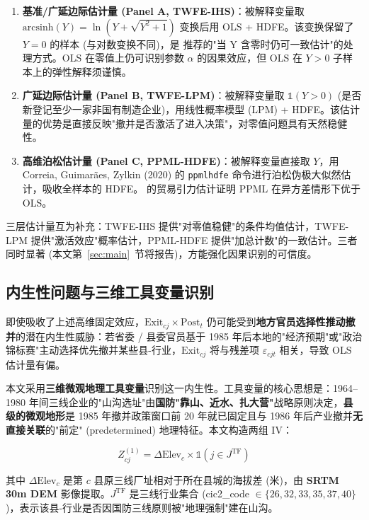\begin{enumerate}
\item \textbf{基准/广延边际估计量 (Panel A, TWFE-IHS)}：被解释变量取 $\mathrm{arcsinh}(Y) = \ln(Y + \sqrt{Y^2 + 1})$ 变换后用 OLS + HDFE。该变换保留了 $Y=0$ 的样本 (与对数变换不同)，是 \citet{chen2024} 推荐的"当 Y 含零时仍可一致估计"的处理方式。OLS 在零值上仍可识别参数 $\alpha$ 的因果效应，但 OLS 在 $Y>0$ 子样本上的弹性解释须谨慎。
\item \textbf{广延边际估计量 (Panel B, TWFE-LPM)}：被解释变量取 $\mathbb{1}(Y>0)$ (是否新登记至少一家非国有制造企业)，用线性概率模型 (LPM) + HDFE。该估计量的优势是直接反映"撤并是否激活了进入决策"，对零值问题具有天然稳健性。
\item \textbf{高维泊松估计量 (Panel C, PPML-HDFE)}：被解释变量直接取 $Y$，用 Correia, Guimarães, Zylkin (2020) 的 \texttt{ppmlhdfe} 命令进行泊松伪极大似然估计，吸收全样本的 HDFE。\citet{silva2006} 的贸易引力估计证明 PPML 在异方差情形下优于 OLS。
\end{enumerate}

三层估计量互为补充：TWFE-IHS 提供"对零值稳健"的条件均值估计，TWFE-LPM 提供"激活效应"概率估计，PPML-HDFE 提供"加总计数"的一致估计。三者同时显著 (本文第~\ref{sec:main}~节将报告)，方能强化因果识别的可信度。

\subsection{内生性问题与三维工具变量识别}\label{sec:strategy:iv}

即使吸收了上述高维固定效应，$\mathrm{Exit}_{cj} \times \mathrm{Post}_t$ 仍可能受到\textbf{地方官员选择性推动撤并}的潜在内生性威胁：若省委 / 县委官员基于 1985 年后本地的"经济预期"或"政治锦标赛"主动选择优先撤并某些县-行业，$\mathrm{Exit}_{cj}$ 将与残差项 $\varepsilon_{cjt}$ 相关，导致 OLS 估计量有偏。

本文采用\textbf{三维微观地理工具变量}识别这一内生性。工具变量的核心思想是：1964--1980 年间三线企业的"山沟选址"由\textbf{国防"靠山、近水、扎大营"}战略原则决定，\textbf{县级的微观地形}是 1985 年撤并政策窗口前 20 年就已固定且与 1986 年后产业撤并\textbf{无直接关联}的"前定" (predetermined) 地理特征。本文构造两组 IV：

\begin{equation}\label{eq:iv1}
Z_{cj}^{(1)} = \Delta \mathrm{Elev}_{c} \times \mathbb{1}(j \in J^{\mathrm{TF}})
\end{equation}

其中 $\Delta \mathrm{Elev}_{c}$ 是第 $c$ 县原三线厂址相对于所在县城的海拔差 (米)，由 \textbf{SRTM 30m DEM} 影像提取。$J^{\mathrm{TF}}$ 是三线行业集合 (cic2\_code $\in \{26, 32, 33, 35, 37, 40\}$)，表示该县-行业是否因国防三线原则被"地理强制"建在山沟。

